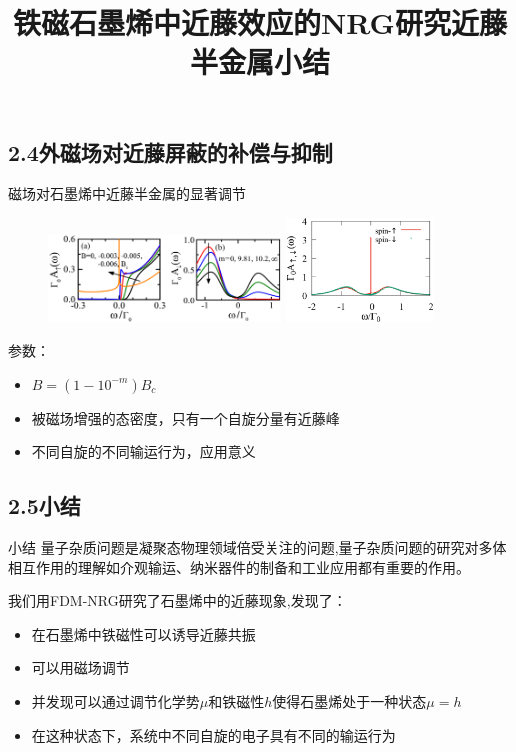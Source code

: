 \documentclass[9pt,t]{beamer} %
\begin{document}
\subsection{2.4外磁场对近藤屏蔽的补偿与抑制}
\title{铁磁石墨烯中近藤效应的NRG研究\qquad \qquad \qquad \qquad 近藤半金属}
\begin{frame}{磁场对石墨烯中近藤半金属的显著调节}
\begin{figure}
\includegraphics[width=0.55\textwidth ,height=0.25\textwidth]{dos-B.png}
\includegraphics[width=0.35\textwidth,height=0.25\textwidth]{halfmetal.png}
\end{figure}
参数：
\begin{itemize}
\vspace{0.3cm}
\setlength\itemsep{0.5em}
\item $B=(1-10^{-m})B_{c}$
\item 被磁场增强的态密度，只有一个自旋分量有近藤峰
\item 不同自旋的不同输运行为，应用意义
\end{itemize}
\end{frame}

\subsection{2.5小结}
\title{小结}
\begin{frame}[t]{小结}
\vspace{0.6cm}
\qquad 量子杂质问题是凝聚态物理领域倍受关注的问题,量子杂质问题的研究对多体相互作用的理解如介观输运、纳米器件的制备和工业应用都有重要的作用。

\vspace{0.3cm}
\qquad 我们用FDM-NRG研究了石墨烯中的近藤现象,发现了：
\vspace{0.2cm}
\begin{itemize}
\item 在石墨烯中铁磁性可以诱导近藤共振
\item 可以用磁场调节
\item 并发现可以通过调节化学势$\mu$和铁磁性$h$使得石墨烯处于一种状态$\mu=h$
\item 在这种状态下，系统中不同自旋的电子具有不同的输运行为
\end{itemize}

\end{frame}
\end{document}
